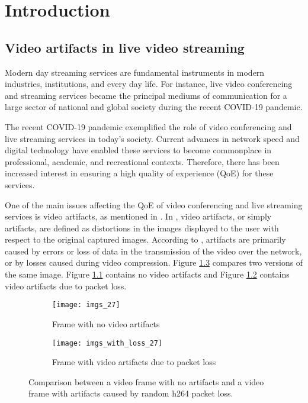 
\chapter{Introduction}
\label{chp:intro}

\section{Video artifacts in live video streaming}
\label{sec:intro_artifacts}

Modern day streaming services are fundamental instruments in modern industries, institutions, and every day life. For instance, live video conferencing and streaming services became the principal mediums of communication for a large sector of national and global society during the recent COVID-19 pandemic.

The recent COVID-19 pandemic exemplified the role of video conferencing and live streaming services in today's society. Current advances in network speed and digital technology have enabled these services to become commonplace in professional, academic, and recreational contexts. Therefore, there has been increased interest in ensuring a high quality of experience (QoE) for these services.

One of the main issues affecting the QoE of video conferencing and live streaming services is video artifacts, as mentioned in \cite{Vranjes2018, Korhonen2018}. In \cite{Greengrass2009}, video artifacts, or simply artifacts, are defined as distortions in the images displayed to the user with respect to the original captured images. According to \cite{Vranjes2018}, artifacts are primarily caused by errors or loss of data in the transmission of the video over the network, or by losses caused during video compression. Figure \ref{fig:1.1} compares two versions of the same image. Figure \ref{fig:1.1.a} contains no video artifacts and Figure \ref{fig:1.1.b} contains video artifacts due to packet loss.

\begin{figure} [!h]
  \centering
  
  \begin{subfigure}[t]{0.49\textwidth}
    \centering
    \texttt{[image: imgs\_27]}
    \caption{Frame with no video artifacts}
    \label{fig:1.1.a}
  \end{subfigure}
  \hfill
  \begin{subfigure}[t]{0.49\textwidth}
    \centering
    \texttt{[image: imgs\_with\_loss\_27]}
    \caption{Frame with video artifacts due to packet loss}
    \label{fig:1.1.b}
  \end{subfigure}
  
  \caption{Comparison between a video frame with no artifacts and a video frame with artifacts caused by random h264 packet loss.}
  \label{fig:1.1}

\end{figure}


